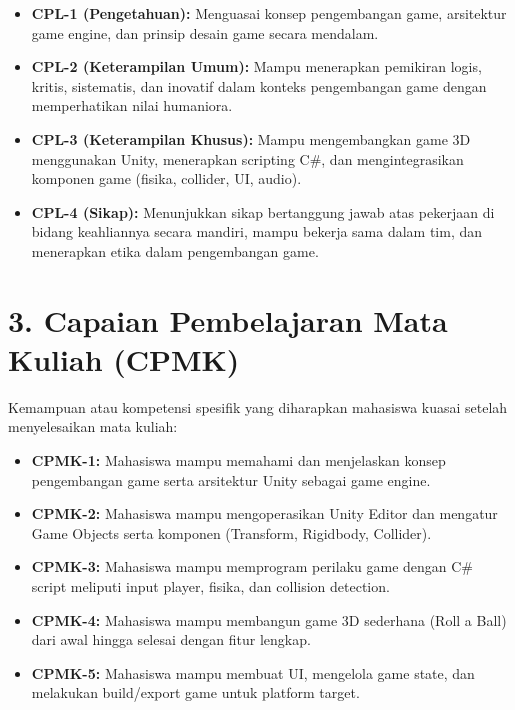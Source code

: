 \documentclass[12pt,a4paper]{article}
\begin{document}
\begin{itemize}[leftmargin=*]
  \item \textbf{CPL-1 (Pengetahuan):} Menguasai konsep pengembangan game, arsitektur game engine, dan prinsip desain game secara mendalam.
  
  \item \textbf{CPL-2 (Keterampilan Umum):} Mampu menerapkan pemikiran logis, kritis, sistematis, dan inovatif dalam konteks pengembangan game dengan memperhatikan nilai humaniora.
  
  \item \textbf{CPL-3 (Keterampilan Khusus):} Mampu mengembangkan game 3D menggunakan Unity, menerapkan scripting C\#, dan mengintegrasikan komponen game (fisika, collider, UI, audio).
  
  \item \textbf{CPL-4 (Sikap):} Menunjukkan sikap bertanggung jawab atas pekerjaan di bidang keahliannya secara mandiri, mampu bekerja sama dalam tim, dan menerapkan etika dalam pengembangan game.
\end{itemize}

\vspace{0.5cm}

\section*{3. Capaian Pembelajaran Mata Kuliah (CPMK)}

Kemampuan atau kompetensi spesifik yang diharapkan mahasiswa kuasai setelah menyelesaikan mata kuliah:

\begin{itemize}[leftmargin=*]
  \item \textbf{CPMK-1:} Mahasiswa mampu memahami dan menjelaskan konsep pengembangan game serta arsitektur Unity sebagai game engine.
  
  \item \textbf{CPMK-2:} Mahasiswa mampu mengoperasikan Unity Editor dan mengatur Game Objects serta komponen (Transform, Rigidbody, Collider).
  
  \item \textbf{CPMK-3:} Mahasiswa mampu memprogram perilaku game dengan C\# script meliputi input player, fisika, dan collision detection.
  
  \item \textbf{CPMK-4:} Mahasiswa mampu membangun game 3D sederhana (Roll a Ball) dari awal hingga selesai dengan fitur lengkap.
  
  \item \textbf{CPMK-5:} Mahasiswa mampu membuat UI, mengelola game state, dan melakukan build/export game untuk platform target.
\end{itemize}
\end{document}
